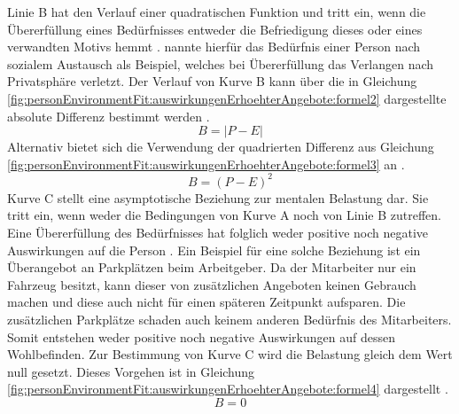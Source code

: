 Linie B hat den Verlauf einer quadratischen Funktion und tritt ein, wenn die Übererfüllung eines Bedürfnisses entweder die Befriedigung dieses oder eines verwandten Motivs hemmt \cite[S. 5]{caplan:1987}. \textcite[S. 12]{harrison:1978} nannte hierfür das Bedürfnis einer Person nach sozialem Austausch als Beispiel, welches bei Übererfüllung das Verlangen nach Privatsphäre verletzt. Der Verlauf von Kurve B kann über die in Gleichung \ref{fig:personEnvironmentFit:auswirkungenErhoehterAngebote:formel2} dargestellte absolute Differenz bestimmt werden \cite[S. 2]{edwards:1993}.
\begin{equation}
	B = |P - E|
	\label{fig:personEnvironmentFit:auswirkungenErhoehterAngebote:formel2}
\end{equation}
Alternativ bietet sich die Verwendung der quadrierten Differenz aus Gleichung \ref{fig:personEnvironmentFit:auswirkungenErhoehterAngebote:formel3} an \cite[S. 2]{edwards:1993}.
\begin{equation}
	B = (P - E)^2
	\label{fig:personEnvironmentFit:auswirkungenErhoehterAngebote:formel3}
\end{equation}
Kurve C stellt eine asymptotische Beziehung zur mentalen Belastung dar. Sie tritt ein, wenn weder die Bedingungen von Kurve A noch von Linie B zutreffen. Eine Übererfüllung des Bedürfnisses hat folglich weder positive noch negative Auswirkungen auf die Person \cite[S. 30]{mechanismsOfJobStressAndStrain:1982}. Ein Beispiel für eine solche Beziehung ist ein Überangebot an Parkplätzen beim Arbeitgeber. Da der Mitarbeiter nur ein Fahrzeug besitzt, kann dieser von zusätzlichen Angeboten keinen Gebrauch machen und diese auch nicht für einen späteren Zeitpunkt aufsparen. Die zusätzlichen Parkplätze schaden auch keinem anderen Bedürfnis des Mitarbeiters. Somit entstehen weder positive noch negative Auswirkungen auf dessen Wohlbefinden. Zur Bestimmung von Kurve C wird die Belastung gleich dem Wert null gesetzt. Dieses Vorgehen ist in Gleichung \ref{fig:personEnvironmentFit:auswirkungenErhoehterAngebote:formel4} dargestellt \cite[S. 2]{edwards:1993}.
\begin{equation}
	B = 0
	\label{fig:personEnvironmentFit:auswirkungenErhoehterAngebote:formel4}
\end{equation}
